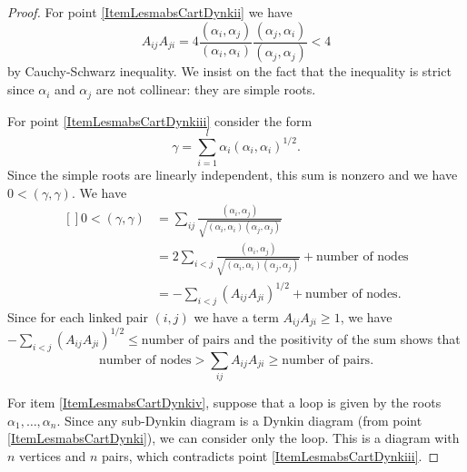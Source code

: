 \begin{proof}
    For point \ref{ItemLesmabsCartDynkii} we have
    \begin{equation}
        A_{ij}A_{ji}=4\frac{ (\alpha_i,\alpha_j) }{ (\alpha_i,\alpha_i) }\frac{ (\alpha_j,\alpha_i) }{ (\alpha_j,\alpha_j) }<4
    \end{equation}
    by Cauchy-Schwarz inequality. We insist on the fact that the inequality is strict since \( \alpha_i\) and \( \alpha_j\) are not collinear: they are simple roots.

    For point \ref{ItemLesmabsCartDynkiii} consider the form
    \begin{equation}
        \gamma=\sum_{i=1}^l\alpha_i(\alpha_i,\alpha_i)^{1/2}.
    \end{equation}
    Since the simple roots are linearly independent, this sum is nonzero and we have \( 0<(\gamma,\gamma)\). We have
    \begin{equation}
        \begin{aligned}[]
            0<(\gamma,\gamma)&=\sum_{ij}\frac{ (\alpha_i,\alpha_j) }{ \sqrt{(\alpha_i,\alpha_i)(\alpha_j,\alpha_j)} }\\
            &=2\sum_{i<j} \frac{ (\alpha_i,\alpha_j) }{ \sqrt{(\alpha_i,\alpha_i)(\alpha_j,\alpha_j)} }+\text{number of nodes}\\
            &=-\sum_{i<j}(A_{ij}A_{ji})^{1/2}+\text{number of nodes}.
        \end{aligned}
    \end{equation}
    Since for each linked pair \( (i,j)\) we have a term \( A_{ij}A_{ji}\geq 1\), we have \( -\sum_{i<j}(A_{ij}A_{ji})^{1/2}\leq \text{number of pairs}\) and the positivity of the sum shows that
    \begin{equation}
        \text{number of nodes}>\sum_{ij}A_{ij}A_{ji}\geq\text{number of pairs}.
    \end{equation}

    For item \ref{ItemLesmabsCartDynkiv}, suppose that a loop is given by the roots \( \alpha_1,\ldots,\alpha_n\). Since any sub-Dynkin diagram is a Dynkin diagram (from point \ref{ItemLesmabsCartDynki}), we can consider only the loop. This is a diagram with \( n\) vertices and \( n\) pairs, which contradicts point \ref{ItemLesmabsCartDynkiii}.


\end{proof}
